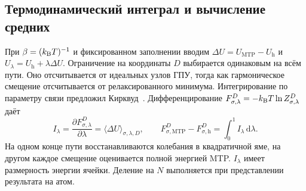 \subsection{Термодинамический интеграл и вычисление средних}

При $\beta=(k_{\rm B}T)^{-1}$ и фиксированном заполнении вводим
$\Delta U=U_{\mathrm{MTP}}-U_{\mathrm h}$ и
$U_\lambda=U_{\mathrm h}+\lambda\Delta U$. Ограничение на координаты $D$
выбирается одинаковым на всём пути. Оно отсчитывается от идеальных узлов
ГПУ, тогда как гармоническое смещение отсчитывается от релаксированного
минимума. Интегрирование по параметру связи предложил
Кирквуд~\cite{kirkwood1935}. Дифференцирование
$F_{\sigma,\lambda}^D=-k_{\rm B}T\ln Z_{\sigma,\lambda}^D$ даёт
\begin{equation}
 I_\lambda=\frac{\partial F_{\sigma,\lambda}^D}{\partial\lambda}
  =\langle\Delta U\rangle_{\sigma,\lambda,D},\qquad
 F_{\sigma,\mathrm{MTP}}^D-F_{\sigma,\mathrm h}^D
  =\int_0^1 I_\lambda\,\mathrm d\lambda .
\end{equation}
На одном конце пути восстанавливаются колебания в квадратичной яме, на другом
каждое смещение оценивается полной энергией MTP. $I_\lambda$ имеет
размерность энергии ячейки. Деление на $N$ выполняется при представлении
результата на атом.

